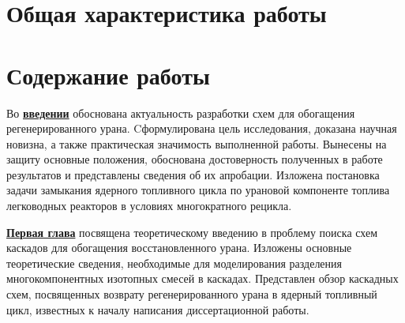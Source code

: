 \section*{Общая характеристика работы}

\newcommand{\actuality}{\underline{\textbf{\actualityTXT}}}
\newcommand{\progress}{\underline{\textbf{\progressTXT}}}
\newcommand{\aim}{\underline{{\textbf\aimTXT}}}
\newcommand{\tasks}{\underline{\textbf{\tasksTXT}}}
\newcommand{\novelty}{\underline{\textbf{\noveltyTXT}}}
\newcommand{\influence}{\underline{\textbf{\influenceTXT}}}
\newcommand{\methods}{\underline{\textbf{\methodsTXT}}}
\newcommand{\defpositions}{\underline{\textbf{\defpositionsTXT}}}
\newcommand{\reliability}{\underline{\textbf{\reliabilityTXT}}}
\newcommand{\probation}{\underline{\textbf{\probationTXT}}}
\newcommand{\contribution}{\underline{\textbf{\contributionTXT}}}
\newcommand{\publications}{\underline{\textbf{\publicationsTXT}}}




\section*{Содержание работы}
Во \underline{\textbf{введении}} обоснована актуальность разработки схем для обогащения регенерированного урана. Cформулирована цель исследования, доказана научная новизна, а также практическая значимость выполненной работы. Вынесены на защиту основные положения, обоснована достоверность полученных в работе результатов и представлены сведения об их апробации. Изложена постановка задачи замыкания ядерного топливного цикла по урановой компоненте топлива легководных реакторов в условиях многократного рецикла.

\underline{\textbf{Первая глава}} посвящена теоретическому введению в проблему поиска схем каскадов для обогащения восстановленного урана. Изложены основные теоретические сведения, необходимые для моделирования разделения многокомпонентных изотопных смесей в каскадах. Представлен обзор каскадных схем, посвященных возврату регенерированного урана в ядерный топливный цикл, известных к началу написания диссертационной работы.

